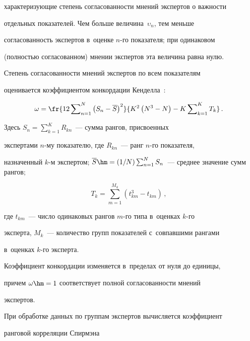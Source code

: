 характеризующие степень согласованности мнений экспертов о важности 

отдельных показателей. Чем больше величина~$\upsilon_n$, тем меньше 

согласованность экспертов в~оценке $n$-го показателя; при одинаковом 

(полностью согласованном) мнении экспертов эта величина равна нулю. 



  Степень согласованности мнений экспертов по всем показателям 

оценивается коэффициентом конкордации Кенделла~\cite{8-zac}:

  \begin{equation*}

  \omega= \fr{12\sum\nolimits^N_{n=1} \left( S_n-\overline{S}\right)^2} 

{K^2\left( N^3-N\right) -K\sum\nolimits^K_{k=1} T_k}\,.


  \end{equation*}

Здесь  $S_n=\sum\nolimits^K_{k=1} R_{kn}$~--- сумма рангов, присвоенных 

экспертами $n$-му показателю, где $R_{kn}$~--- ранг $n$-го показателя, 

назначенный $k$-м экспертом; $\overline{S}\hm= (1/N)\sum\nolimits^N_{n=1} 

S_n$~--- среднее значение сумм рангов;

$$

T_k= \sum\limits_{m=1}^{M_k} \left( t^3_{km}-t_{km}\right)\,,

$$

где $t_{km}$~--- число одинаковых рангов $m$-го типа в~оценках $k$-го 

эксперта, $M_k$~--- количество групп показателей с~совпавшими рангами 

в~оценках $k$-го эксперта.



  Коэффициент конкордации изменяется в~пределах от нуля до единицы, 

причем $\omega\hm=1$ соответствует полной согласованности мнений 

экспертов.

  

  При обработке данных по группам экспертов вычисляется коэффициент 

ранговой корреляции Спирмэна~\cite{8-zac}

